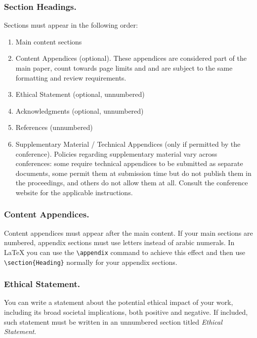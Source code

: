 \subsubsection{Section Headings.}
Sections must appear in the following order:
\begin{enumerate}
\item Main content sections
\item Content Appendices (optional).  These appendices are considered part of the main paper, count towards page limits and and are subject to the same formatting and review requirements.
\item Ethical Statement (optional, unnumbered)
\item Acknowledgments (optional, unnumbered)
\item References (unnumbered)
\item Supplementary Material / Technical Appendices (only if permitted by the conference). Policies regarding supplementary material vary across conferences: some require technical appendices to be submitted as separate documents, some permit them at submission time but do not publish them in the proceedings, and others do not allow them at all. Consult the conference website for the applicable instructions.
\end{enumerate}

\subsubsection{Content Appendices.}
Content appendices must appear after the main content. If your main sections are numbered, appendix sections must use letters instead of arabic numerals. In \LaTeX{} you can use the \texttt{\textbackslash appendix} command to achieve this effect and then use \texttt{\textbackslash section\{Heading\}} normally for your appendix sections.

\subsubsection{Ethical Statement.}
You can write a statement about the potential ethical impact of your work, including its broad societal implications, both positive and negative. If included, such statement must be written in an unnumbered section titled \emph{Ethical Statement}.

